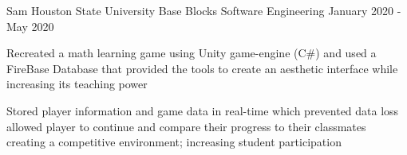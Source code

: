 \begin{cventries}
    \cventry
      {Sam Houston State University} %
	  {Base Blocks} %
      {Software Engineering} %
      {January 2020 - May 2020} %
      {
        \begin{cvitems} %
		    \item {Recreated a math learning game using Unity game-engine (C\#) and used a FireBase Database that provided the tools to create an aesthetic interface while increasing its teaching power}
	        \item {Stored player information and game data in real-time which prevented data loss allowed player to continue and compare their progress to their classmates creating a competitive environment; increasing student participation}
       \end{cvitems}
      }


\end{cventries}
